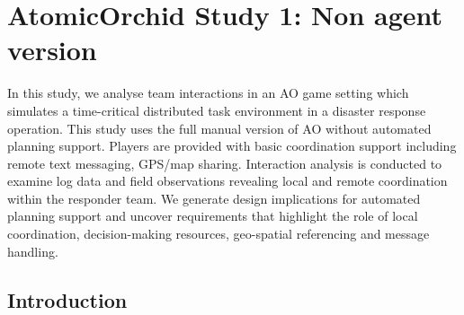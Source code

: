 \chapter{AtomicOrchid Study 1: Non agent version}\label{ch:studyone} %
In this study, we analyse team interactions in an \acf{AO} game setting which simulates a time-critical distributed task environment in a disaster response operation. This study uses the full manual version of \acf{AO} without automated planning support. Players are provided with basic coordination support including remote text messaging, GPS/map sharing. Interaction analysis is conducted to examine log data and field observations revealing local and remote coordination within the responder team. We generate design implications for automated planning support and uncover requirements that highlight the role of local coordination, decision-making resources, geo-spatial referencing and message handling. \\

\section{Introduction}


